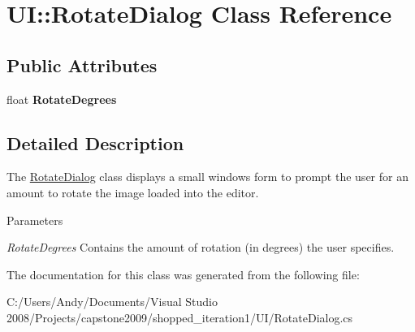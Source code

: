 \hypertarget{class_u_i_1_1_rotate_dialog}{
\section{UI::RotateDialog Class Reference}
\label{class_u_i_1_1_rotate_dialog}
}
\subsection*{Public Attributes}
\begin{DoxyCompactItemize}
\item 
\hypertarget{class_u_i_1_1_rotate_dialog_a6ea5257142dfe12543d77ab37bdf0edc}{
float {\bfseries RotateDegrees}}
\label{class_u_i_1_1_rotate_dialog_a6ea5257142dfe12543d77ab37bdf0edc}

\end{DoxyCompactItemize}


\subsection{Detailed Description}
The \hyperlink{class_u_i_1_1_rotate_dialog}{RotateDialog} class displays a small windows form to prompt the user for an amount to rotate the image loaded into the editor.


\begin{DoxyParams}{Parameters}
\item[{\em RotateDegrees}]Contains the amount of rotation (in degrees) the user specifies. \end{DoxyParams}


The documentation for this class was generated from the following file:\begin{DoxyCompactItemize}
\item 
C:/Users/Andy/Documents/Visual Studio 2008/Projects/capstone2009/shopped\_\-iteration1/UI/RotateDialog.cs\end{DoxyCompactItemize}
